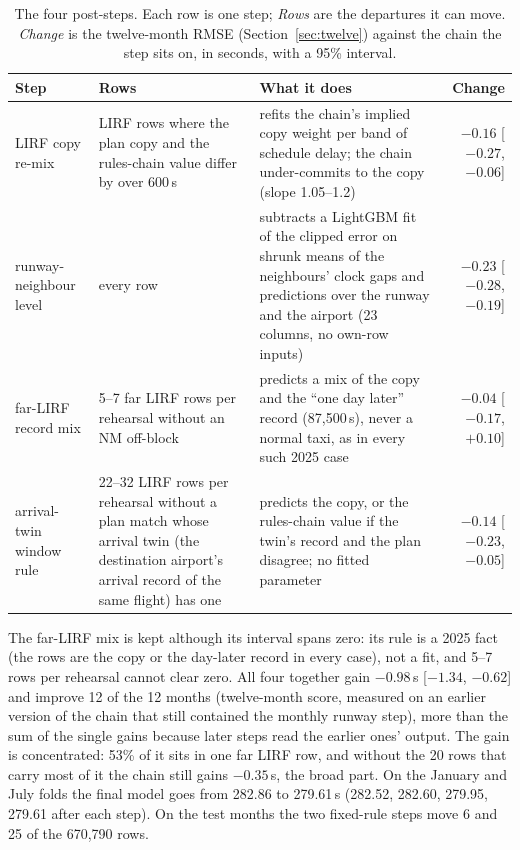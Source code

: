 \documentclass[
  manuscript=article,
  layout=preprint,
  year=2026,
  volume=x,
]{extra/joas}
\begin{document}
\begin{table}[htbp!]
  \centering
  \footnotesize
  \caption{The four post-steps. Each row is one step; \emph{Rows} are the departures it can move. \emph{Change} is the twelve-month RMSE (Section~\ref{sec:twelve}) against the chain the step sits on, in seconds, with a 95\% interval.}
  \label{tb:poststeps}
  \begin{tabular}{L{0.18\textwidth}L{0.17\textwidth}L{0.45\textwidth}r}
  \toprule
  \textbf{Step} & \textbf{Rows} & \textbf{What it does} & \textbf{Change} \\
  \midrule
  LIRF copy re-mix & LIRF rows where the plan copy and the rules-chain value differ by over 600\,s & refits the chain's implied copy weight per band of schedule delay; the chain under-commits to the copy (slope 1.05--1.2) & $-0.16$ [$-0.27$, $-0.06$] \\
  runway-neighbour level & every row & subtracts a LightGBM fit of the clipped error on shrunk means of the neighbours' clock gaps and predictions over the runway and the airport (23 columns, no own-row inputs) & $-0.23$ [$-0.28$, $-0.19$] \\
  far-LIRF record mix & 5--7 far LIRF rows per rehearsal without an NM off-block & predicts a mix of the copy and the ``one day later'' record (87,500\,s), never a normal taxi, as in every such 2025 case & $-0.04$ [$-0.17$, $+0.10$] \\
  arrival-twin window rule & 22--32 LIRF rows per rehearsal without a plan match whose arrival twin (the destination airport's arrival record of the same flight) has one & predicts the copy, or the rules-chain value if the twin's record and the plan disagree; no fitted parameter & $-0.14$ [$-0.23$, $-0.05$] \\
  \bottomrule
  \end{tabular}
\end{table}

The far-LIRF mix is kept although its interval spans zero: its rule is a 2025 fact (the rows are the copy or the day-later record in every case), not a
fit, and 5--7 rows per rehearsal cannot clear zero. All four together gain $-0.98$\,s [$-1.34$, $-0.62$] and improve 12 of the 12 months (twelve-month score, measured on an earlier version of the chain that still contained the monthly runway step), more than the sum of the single
gains because later steps read the earlier ones' output. The gain is concentrated: 53\% of it sits in one far LIRF row, and without the 20 rows that carry most of it
the chain still gains $-0.35$\,s, the broad part. On the January and July folds the final model goes from 282.86 to 279.61\,s (282.52, 282.60, 279.95, 279.61 after each step).
On the test months the two fixed-rule steps move 6 and 25 of the 670,790 rows.
\end{document}
